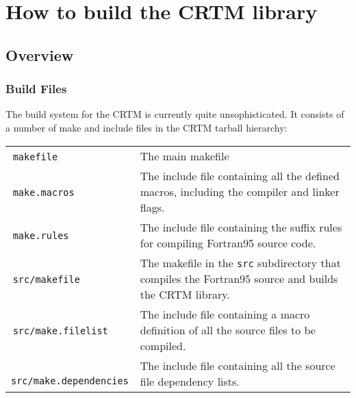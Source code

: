 \chapter{How to build the CRTM library}

\section{Overview}

\subsection{Build Files}
The build system for the CRTM is currently quite unsophisticated. It consists of a number of make and include files in the CRTM tarball hierarchy:

\begin{tabular}{l@{ : }p{4.75in}}
  \,\texttt{makefile} & The main makefile\\
  \,\texttt{make.macros} & The include file containing all the defined macros, including the compiler and linker flags.\\
  \,\texttt{make.rules} & The include file containing the suffix rules for compiling Fortran95 source code.\\
  \,\texttt{src/makefile} & The makefile in the \texttt{src} subdirectory that compiles the Fortran95 source and builds the CRTM library.\\
  \,\texttt{src/make.filelist} & The include file containing a macro definition of all the source files to be compiled.\\
  \,\texttt{src/make.dependencies} & The include file containing all the source file dependency lists.
\end{tabular}

